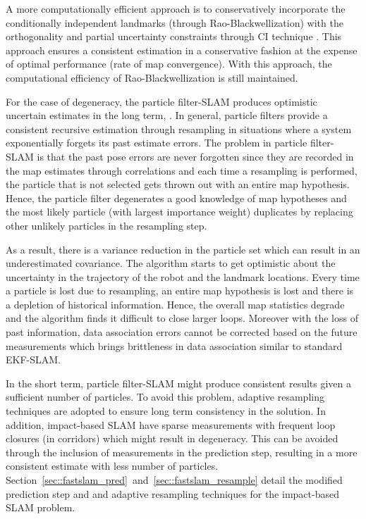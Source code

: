A more computationally efficient approach is to conservatively incorporate the conditionally independent landmarks (through Rao-Blackwellization) with the orthogonality and partial uncertainty constraints through \acf{CI} technique \cite{julier2007using}. This approach ensures a consistent estimation in a conservative fashion at the expense of optimal performance (rate of map convergence). With this approach, the computational efficiency of Rao-Blackwellization is still maintained.

For the case of degeneracy, the particle filter-SLAM produces optimistic uncertain estimates in the long term, \cite{bailey2006consistency}. In general, particle filters provide a consistent recursive estimation through resampling in situations where a system exponentially forgets its past estimate errors. The problem in particle filter-SLAM is that the past pose errors are never forgotten since they are recorded in the map estimates through correlations and each time a resampling is performed, the particle that is not selected gets thrown out with an entire map hypothesis. Hence, the particle filter degenerates a good knowledge of map hypotheses and the most likely particle (with largest importance weight) duplicates by replacing other unlikely particles in the resampling step. 

As a result, there is a variance reduction in the particle set which can result in an underestimated covariance. The algorithm starts to get optimistic about the uncertainty in the trajectory of the robot and the landmark locations. Every time a particle is lost due to resampling, an entire map hypothesis is lost and there is a depletion of historical information. Hence, the overall map statistics degrade and the algorithm finds it difficult to close larger loops. Moreover with the loss of past information, data association errors cannot be corrected based on the future measurements which brings brittleness in data association similar to standard EKF-SLAM.

In the short term, particle filter-SLAM might produce consistent results given a sufficient number of particles. To avoid this problem, adaptive resampling techniques are adopted to ensure long term consistency in the solution. In addition, impact-based SLAM have sparse measurements with frequent loop closures (in corridors) which might result in degeneracy. This can be avoided through the inclusion of measurements in the prediction step, resulting in a more consistent estimate with less number of particles. Section~\ref{sec::fastslam_pred}~and~\ref{sec::fastslam_resample} detail the modified prediction step and and adaptive resampling techniques for the impact-based SLAM problem.

